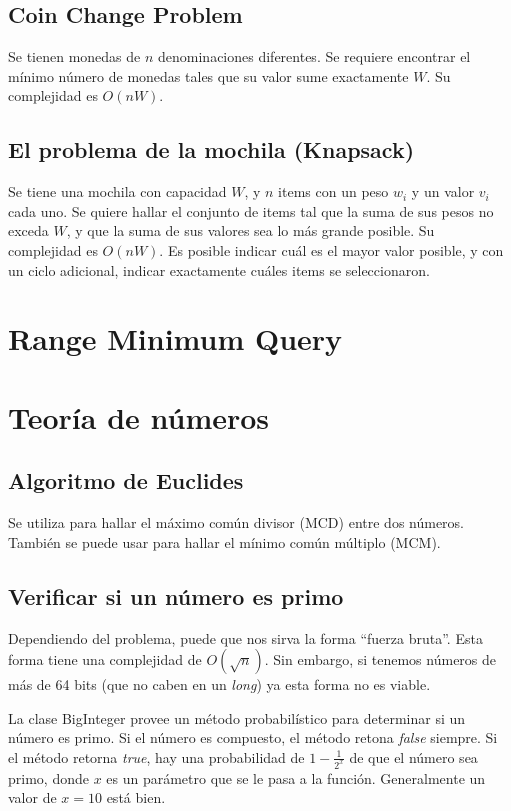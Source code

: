 \documentclass{article}
\begin{document}
\begin{multicols}{2}
	\subsection{Coin Change Problem}
	Se tienen monedas de \( n \) denominaciones diferentes. Se requiere encontrar el mínimo número de monedas tales que su valor sume exactamente \( W \). Su complejidad es \( O(nW) \).
		
	
	\subsection{El problema de la mochila (Knapsack)}
	Se tiene una mochila con capacidad \( W \), y \( n \) items con un peso \( w_i \) y un valor \( v_i \) cada uno. Se quiere hallar el conjunto de items tal que la suma de sus pesos no exceda \( W \), y que la suma de sus valores sea lo más grande posible. Su complejidad es \( O(nW) \). Es posible indicar cuál es el mayor valor posible, y con un ciclo adicional, indicar exactamente cuáles items se seleccionaron.
	
	
\section{Range Minimum Query}


\section{Teoría de números}
	\subsection{Algoritmo de Euclides}
	Se utiliza para hallar el máximo común divisor (MCD) entre dos números. También se puede usar para hallar el mínimo común múltiplo (MCM).
	

	\subsection{Verificar si un número es primo}
	Dependiendo del problema, puede que nos sirva la forma ``fuerza bruta''. Esta forma tiene una complejidad de \( O(\sqrt{n}) \). Sin embargo, si tenemos números de más de 64 bits (que no caben en un \emph{long}) ya esta forma no es viable. 
	
	La clase BigInteger provee un método probabilístico para determinar si un número es primo. Si el número es compuesto, el método retona \emph{false} siempre. Si el método retorna \emph{true}, hay una probabilidad de \( 1-\frac{1}{2^x} \) de que el número sea primo, donde \(x\) es un parámetro que se le pasa a la función. Generalmente un valor de \(x = 10\) está bien.
	


\end{multicols}
\end{document}
